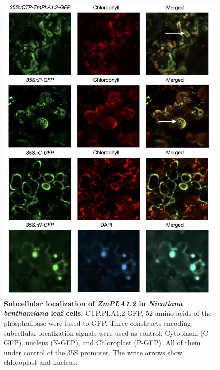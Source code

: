 \documentclass[9pt,twocolumn,twoside,lineno]{BioRxiv}
\begin{document}
\begin{figure}[t]
\begin{center}
\includegraphics[width=0.6\paperwidth]{Sup_Figures/Sup_Fig_7.png}
\caption{\textbf{Subcellular localization of \textit{ZmPLA1.2} in \textit{Nicotiana benthamiana} leaf cells.}   
CTP.PLA1.2-GFP, 52 amino acids of the phospholipase were fused to GFP. 
Three constructs encoding subcellular localization signals were used as control; Cytoplasm (C-GFP), nucleus (N-GFP), and Chloroplast (P-GFP). All of them under control of the 35S promoter. The write arrows show chloroplast and nucleus.
}
\label{SupFig6}
\end{center}
\end{figure} 

\clearpage
\end{document}
